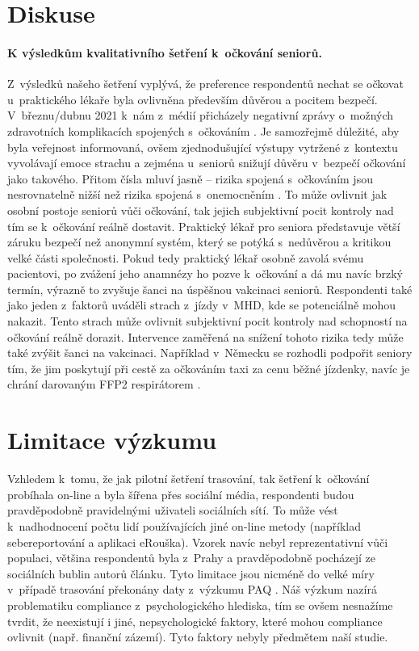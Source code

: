 \section*{Diskuse}

\paragraph*{K výsledkům kvalitativního šetření k~očkování seniorů.}
Z~výsledků našeho šetření vyplývá, že preference respondentů nechat se očkovat u~praktického lékaře byla ovlivněna především důvěrou a pocitem bezpečí. V~březnu/dubnu 2021 k~nám z~médií přicházely negativní zprávy o~možných zdravotních komplikacích spojených s~očkováním \cite{Svamberk2021,MinisterstvoZdravotnictviCR2021a}. Je samozřejmě důležité, aby byla ve\-řej\-nost informovaná, ovšem zjednodušující výstupy vytržené z~kontextu vyvolávají emoce strachu a zejména u~seniorů snižují důvěru v~bezpečí očkování jako takového. Přitom čísla mluví jasně – rizika spojená s~očkováním jsou nesrovnatelně nižší než rizika spojená s~onemocněním \cite{Statniustavprokontroluleciv2021}. 
To může ovlivnit jak osobní postoje seniorů vůči očkování, tak jejich subjektivní pocit kontroly nad tím se k~očkování reálně dostavit. Praktický lékař pro seniora představuje větší záruku bezpečí než anonymní systém, který se potýká s~nedůvěrou a kritikou velké části společnosti. Pokud tedy praktický lékař osobně zavolá svému pacientovi, po zvážení jeho anamnézy ho pozve k~očkování a dá mu navíc brzký termín, výrazně to zvyšuje šanci na úspěšnou vakcinaci seniorů.
Respondenti také jako jeden z~faktorů uváděli strach z~jízdy v~MHD, kde se potenciálně mohou nakazit. Tento strach může ovlivnit subjektivní pocit kontroly nad schopností na očkování reálně dorazit. Intervence zaměřená na snížení tohoto rizika tedy může také zvýšit šanci na vakcinaci. Například v~Německu se rozhodli podpořit seniory tím, že jim poskytují při cestě za očkováním taxi za cenu běžné jízdenky, navíc je chrání darovaným FFP2 respirátorem \cite{Kreijger2021}.

\section*{Limitace výzkumu}

Vzhledem k~tomu, že jak pilotní šetření trasování, tak šetření k~očkování probíhala on-line a byla šířena přes sociální média, respondenti budou pravděpodobně pravidelnými uživateli sociálních sítí. To může vést k~nadhodnocení počtu lidí používajících jiné on-line metody (například sebereportování a aplikaci eRouška). 
Vzorek navíc nebyl reprezentativní vůči populaci, většina respondentů byla z~Prahy a pravděpodobně pocházejí ze sociálních bublin autorů článku.
Tyto limitace jsou nicméně do velké míry v~případě trasování překonány daty z~výzkumu PAQ \cite{Prokop2021a}.
Náš výzkum nazírá problematiku compliance z~psychologického hlediska, tím se ovšem nesnažíme tvrdit, že neexistují i jiné, nepsychologické faktory, které mohou compliance ovlivnit (např. finanční zázemí). Tyto faktory nebyly předmětem naší studie.


